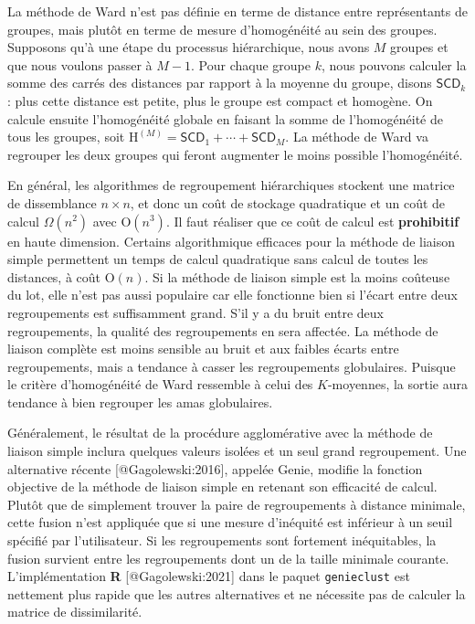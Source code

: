 \documentclass[
  11pt,
  letterpaper,
]{scrbook}
\theoremstyle{definition}
\theoremstyle{remark}
\begin{document}
La méthode de Ward n'est pas définie en terme de distance entre
représentants de groupes, mais plutôt en terme de mesure d'homogénéité
au sein des groupes. Supposons qu'à une étape du processus hiérarchique,
nous avons \(M\) groupes et que nous voulons passer à \(M-1\). Pour
chaque groupe \(k\), nous pouvons calculer la somme des carrés des
distances par rapport à la moyenne du groupe, disons \(\mathsf{SCD}_k\):
plus cette distance est petite, plus le groupe est compact et homogène.
On calcule ensuite l'homogénéité globale en faisant la somme de
l'homogénéité de tous les groupes, soit
\(\mathrm{H}^{(M)} = \mathsf{SCD}_1 + \cdots + \mathsf{SCD}_M\). La
méthode de Ward va regrouper les deux groupes qui feront augmenter le
moins possible l'homogénéité.

En général, les algorithmes de regroupement hiérarchiques stockent une
matrice de dissemblance \(n \times n\), et donc un coût de stockage
quadratique et un coût de calcul \(\Omega(n^2)\) avec
\(\mathrm{O}(n^3)\). Il faut réaliser que ce coût de calcul est
\textbf{prohibitif} en haute dimension. Certains algorithmique efficaces
pour la méthode de liaison simple permettent un temps de calcul
quadratique sans calcul de toutes les distances, à coût
\(\mathrm{O}(n)\). Si la méthode de liaison simple est la moins coûteuse
du lot, elle n'est pas aussi populaire car elle fonctionne bien si
l'écart entre deux regroupements est suffisamment grand. S'il y a du
bruit entre deux regroupements, la qualité des regroupements en sera
affectée. La méthode de liaison complète est moins sensible au bruit et
aux faibles écarts entre regroupements, mais a tendance à casser les
regroupements globulaires. Puisque le critère d'homogénéité de Ward
ressemble à celui des \(K\)-moyennes, la sortie aura tendance à bien
regrouper les amas globulaires.

Généralement, le résultat de la procédure agglomérative avec la méthode
de liaison simple inclura quelques valeurs isolées et un seul grand
regroupement. Une alternative récente {[}@Gagolewski:2016{]}, appelée
Genie, modifie la fonction objective de la méthode de liaison simple en
retenant son efficacité de calcul. Plutôt que de simplement trouver la
paire de regroupements à distance minimale, cette fusion n'est appliquée
que si une mesure d'inéquité est inférieur à un seuil spécifié par
l'utilisateur. Si les regroupements sont fortement inéquitables, la
fusion survient entre les regroupements dont un de la taille minimale
courante. L'implémentation \textbf{R} {[}@Gagolewski:2021{]} dans le
paquet \texttt{genieclust} est nettement plus rapide que les autres
alternatives et ne nécessite pas de calculer la matrice de
dissimilarité.
\end{document}
